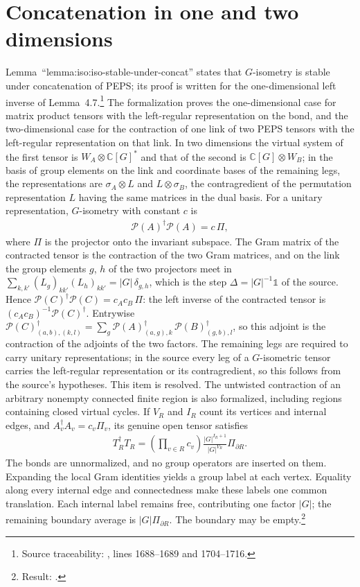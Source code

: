 \documentclass{article}
\begin{document}
\section{Concatenation in one and two dimensions}
Lemma~``lemma:iso:iso-stable-under-concat'' states that $G$-isometry is
stable under concatenation of PEPS; its proof is written for the
one-dimensional left inverse of Lemma~4.7.\footnote{Source traceability:
    , lines 1688--1689 and 1704--1716.}
The formalization proves the one-dimensional case for matrix product
tensors with the left-regular representation on the bond, and the
two-dimensional case for the contraction of one link of two PEPS tensors
with the left-regular representation on that link. In two dimensions the
virtual system of the first tensor is $W_A\otimes\mathbb C[G]^*$ and that
of the second is $\mathbb C[G]\otimes W_B$; in the basis of group elements
on the link and coordinate bases of the remaining legs, the representations
are $\sigma_A\otimes L$ and $L\otimes\sigma_B$, the contragredient of the
permutation representation $L$ having the same matrices in the dual basis.
For a unitary representation, $G$-isometry with constant $c$ is
\begin{align}
    \mathcal P(A)^\dagger\mathcal P(A)=c\,\Pi ,
    \label{eq:rmp_peps_qd_gram}
\end{align}
where $\Pi$ is the projector onto the invariant subspace. The Gram matrix of
the contracted tensor is the contraction of the two Gram matrices, and on the
link the group elements $g$, $h$ of the two projectors meet in
$\sum_{k,k'}(L_g)_{kk'}(L_h)_{kk'}=|G|\,\delta_{g,h}$, which is the step
$\Delta=|G|^{-1}\mathbb 1$ of the source. Hence
$\mathcal P(C)^\dagger\mathcal P(C)=c_Ac_B\,\Pi$: the left inverse of the
contracted tensor is $(c_Ac_B)^{-1}\mathcal P(C)^\dagger$. Entrywise
$\mathcal P(C)^\dagger_{(a,b),(k,l)}
    =\sum_g\mathcal P(A)^\dagger_{(a,g),k}\,\mathcal P(B)^\dagger_{(g,b),l}$,
so this adjoint is the contraction of the adjoints of the two factors. The remaining legs are required to carry
unitary representations; in the source every leg of a $G$-isometric tensor
carries the left-regular representation or its contragredient, so this
follows from the source's hypotheses. This item is resolved.
The untwisted contraction of an arbitrary nonempty connected finite
region is also formalized, including regions containing closed virtual
cycles. If $V_R$ and $I_R$ count its vertices and internal edges, and
$A_v^\dagger A_v=c_v\Pi_v$, its genuine open tensor satisfies
\begin{align}
    T_R^\dagger T_R
      =\left(\prod_{v\in R}c_v\right)
        \frac{|G|^{I_R+1}}{|G|^{V_R}}\Pi_{\partial R}.
    \label{eq:rmp_peps_qd_region_gram}
\end{align}
The bonds are unnormalized, and no group operators are inserted on
them. Expanding the local Gram identities yields a group label at
each vertex. Equality along every internal edge and connectedness
make these labels one common translation. Each internal label remains
free, contributing one factor $|G|$; the remaining boundary average
is $|G|\Pi_{\partial R}$. The boundary may be empty.\footnote{Result:
    .}
\end{document}
